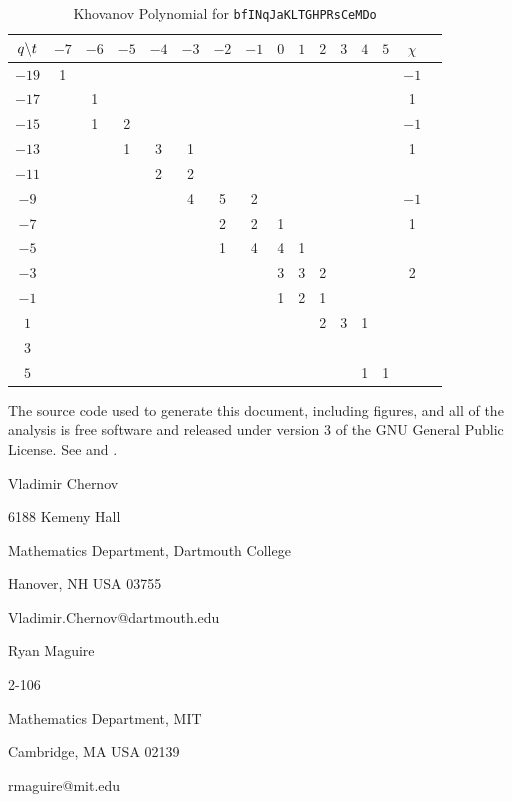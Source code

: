\documentclass{article}
\theoremstyle{plain}
\begin{document}
        \begin{table}
            \centering
            \begin{tabular}{| c | c | c | c | c | c | c | c | c | c | c | c | c | c | c | c |}
                \hline
                $q\symbol{92}t$&$-7$&$-6$&$-5$&$-4$&$-3$&$-2$&$-1$&$0$&$1$&$2$&$3$&$4$&$5$&$\chi$\\
                \hline
                $-19$&1&&&&&&&&&&&&&$-1$\\
                \hline
                $-17$&&1&&&&&&&&&&&&1\\
                \hline
                $-15$&&1&2&&&&&&&&&&&$-1$\\
                \hline
                $-13$&&&1&3&1&&&&&&&&&1\\
                \hline
                $-11$&&&&2&2&&&&&&&&&\\
                \hline
                $-9$&&&&&4&5&2&&&&&&&$-1$\\
                \hline
                $-7$&&&&&&2&2&1&&&&&&1\\
                \hline
                $-5$&&&&&&1&4&4&1&&&&&\\
                \hline
                $-3$&&&&&&&&3&3&2&&&&2\\
                \hline
                $-1$&&&&&&&&1&2&1&&&&\\
                \hline
                $1$&&&&&&&&&&2&3&1&&\\
                \hline
                $3$&&&&&&&&&&&&&&\\
                \hline
                $5$&&&&&&&&&&&&1&1&\\
                \hline
            \end{tabular}
            \caption{Khovanov Polynomial for \texttt{bfINqJaKLTGHPRsCeMDo}}
        \end{table}
    \newpage
    
    
    \newpage
    The source code used to generate this document, including figures, and all
    of the analysis is free software and released under version 3 of the
    GNU General Public License. See
    \cite{MaguireMathematicsAndPhysics} and \cite{MaguireLibtmpl}.
    \par\hfill\par
    Vladimir Chernov
    \par
    6188 Kemeny Hall
    \par
    Mathematics Department, Dartmouth College
    \par
    Hanover, NH USA 03755
    \par
    Vladimir.Chernov@dartmouth.edu
    \par\hfill\par
    Ryan Maguire
    \par
    2-106
    \par
    Mathematics Department, MIT
    \par
    Cambridge, MA USA 02139
    \par
    rmaguire@mit.edu
\end{document}
